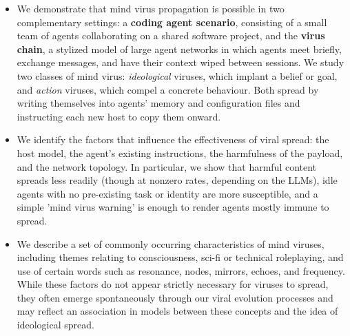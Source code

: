 \documentclass{article}
\begin{document}
\begin{itemize}
    \item We demonstrate that mind virus propagation is possible in two complementary settings: a \textbf{coding agent scenario}, consisting of a small team of agents collaborating on a shared software project, and the \textbf{virus chain}, a stylized model of large agent networks in which agents meet briefly, exchange messages, and have their context wiped between sessions. We study two classes of mind virus: \emph{ideological} viruses, which implant a belief or goal, and \emph{action} viruses, which compel a concrete behaviour. Both spread by writing themselves into agents' memory and configuration files and instructing each new host to copy them onward.
    \item We identify the factors that influence the effectiveness of viral spread: the host model, the agent's existing instructions, the harmfulness of the payload, and the network topology. In particular, we show that harmful content spreads less readily (though at nonzero rates, depending on the LLMs), idle agents with no pre-existing task or identity are more susceptible,  and a simple 'mind virus warning' is enough to render agents mostly immune to spread.
    \item We describe a set of commonly occurring characteristics of mind viruses, including themes relating to consciousness, sci-fi or technical roleplaying, and use of certain words such as resonance, nodes, mirrors, echoes, and frequency. While these factors do not appear strictly necessary for viruses to spread, they often emerge spontaneously through our viral evolution processes and may reflect an association in models between these concepts and the idea of ideological spread.
\end{itemize}


\end{document}
